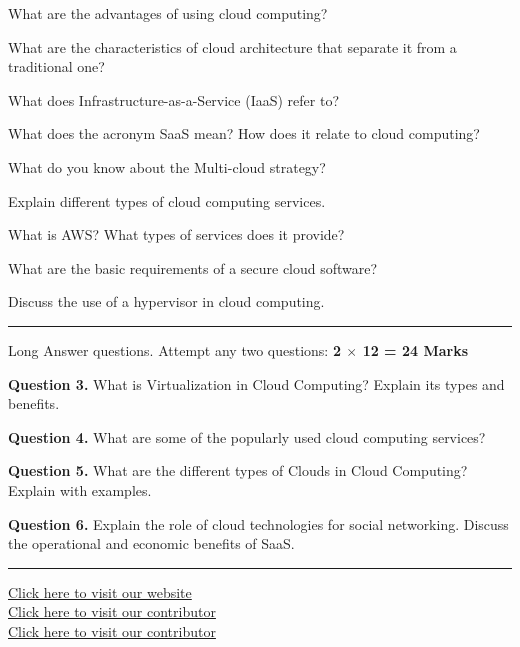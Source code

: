 \documentclass[11pt,a4paper]{article}
\begin{document}
\begin{parts}
  \item What are the advantages of using cloud computing?
  \item What are the characteristics of cloud architecture that separate it from a traditional one?
  \item What does Infrastructure-as-a-Service (IaaS) refer to?
  \item What does the acronym SaaS mean? How does it relate to cloud computing?
  \item What do you know about the Multi-cloud strategy?
  \item Explain different types of cloud computing services.
  \item What is AWS? What types of services does it provide?
  \item What are the basic requirements of a secure cloud software?
  \item Discuss the use of a hypervisor in cloud computing.
\end{parts}

\bigskip


\rule{\linewidth}{0.4pt}\smallskip

Long Answer questions. Attempt any two questions: \hfill   \textbf{2 $ \times$ 12 = 24 Marks}

\medskip



\noindent   \textbf{Question 3.} What is Virtualization in Cloud Computing? Explain its types and benefits.

\medskip



\noindent   \textbf{Question 4.} What are some of the popularly used cloud computing services?

\medskip



\noindent   \textbf{Question 5.} What are the different types of Clouds in Cloud Computing? Explain with examples.

\medskip



\noindent   \textbf{Question 6.} Explain the role of cloud technologies for social networking. Discuss the operational and economic benefits of SaaS.

\vfill
\rule{\linewidth}{0.4pt}

\begin{center}\small
\href{https://bhu-exam.vercel.app/}{Click here to visit our website}\\[4pt]\href{https://me-aryan.vercel.app/}{Click here to visit our contributor}\\[4pt]\href{https://quashan-me.vercel.app/}{Click here to visit our contributor}
\end{center}
\end{document}
